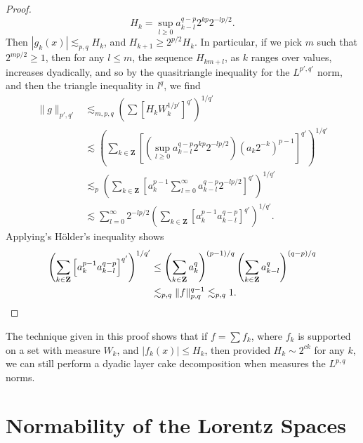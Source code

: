 \begin{proof}
    \[ H_k = \sup_{l \geq 0} a_{k-l}^{q-p} 2^{kp} 2^{-lp/2}. \]
    Then $|g_k(x)| \lesssim_{p,q} H_k$, and $H_{k+1} \geq 2^{p/2} H_k$. In particular, if we pick $m$ such that $2^{mp/2} \geq 1$, then for any $l \leq m$, the sequence $H_{km + l}$, as $k$ ranges over values, increases dyadically, and so by the quasitriangle inequality for the $L^{p',q'}$ norm, and then the triangle inequality in $l^q$, we find
    \begin{align*}
        \| g \|_{p',q'} &\lesssim_{m,p,q} \left( \sum [H_k W_k^{1/p'}]^{q'} \right)^{1/q'}\\
        &\lesssim \left( \sum_{k \in \mathbf{Z}} \left[ \left( \sup_{l \geq 0} a_{k-l}^{q-p} 2^{kp} 2^{-lp/2} \right) (a_k 2^{-k})^{p-1} \right]^{q'} \right)^{1/q'}\\
        &\lesssim_p \left( \sum_{k \in \mathbf{Z}} \left[ a_k^{p-1} \sum_{l = 0}^\infty a_{k-l}^{q-p} 2^{-lp/2} \right]^{q'} \right)^{1/q'}\\
        &\lesssim \sum_{l = 0}^\infty 2^{-lp/2} \left( \sum_{k \in \mathbf{Z}} \left[ a_k^{p-1} a_{k-l}^{q-p} \right]^{q'} \right)^{1/q'}.
    \end{align*}
    Applying's H\"{o}lder's inequality shows
    \begin{align*}
        \left( \sum_{k \in \mathbf{Z}} \left[ a_k^{p-1} a_{k-l}^{q-p} \right]^{q'} \right)^{1/q'} &\leq  \left( \sum_{k \in \mathbf{Z}} a_k^q \right)^{(p-1)/q} \left( \sum_{k \in \mathbf{Z}} a_{k-l}^q \right)^{(q-p)/q}\\
        &\lesssim_{p,q} \| f \|_{p,q}^{q-1} \lesssim_{p,q} 1. \qedhere
    \end{align*}
\end{proof}

\begin{remark}
    The technique given in this proof shows that if $f = \sum f_k$, where $f_k$ is supported on a set with measure $W_k$, and $|f_k(x)| \leq H_k$, then provided $H_k \sim 2^{ck}$ for any $k$, we can still perform a dyadic layer cake decomposition when measures the $L^{p,q}$ norms.
\end{remark}

\section{Normability of the Lorentz Spaces}

